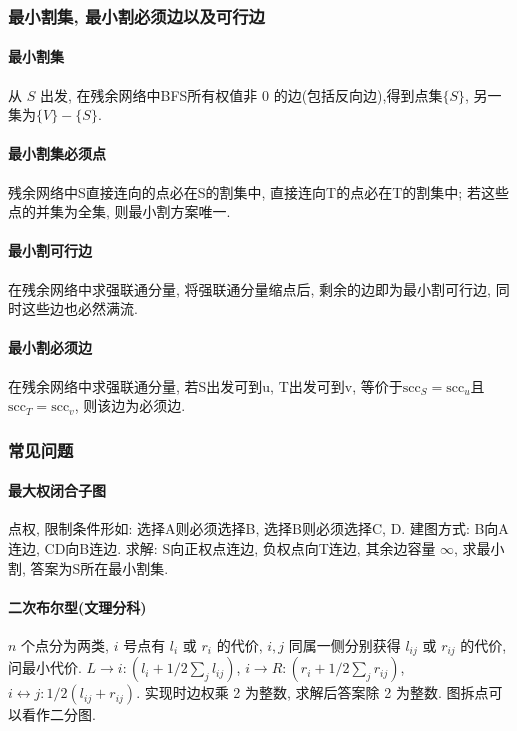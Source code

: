 \subsubsection*{最小割集, 最小割必须边以及可行边}

\paragraph{最小割集} 从 $S$ 出发, 在残余网络中BFS所有权值非 $0$ 的边(包括反向边),得到点集$\{S\}$, 另一集为$\{V\} - \{S\}$. 
\paragraph{最小割集必须点} 残余网络中S直接连向的点必在S的割集中, 直接连向T的点必在T的割集中; 若这些点的并集为全集, 则最小割方案唯一.
\paragraph{最小割可行边} 在残余网络中求强联通分量, 将强联通分量缩点后, 剩余的边即为最小割可行边, 同时这些边也必然满流.
\paragraph{最小割必须边} 在残余网络中求强联通分量, 若S出发可到u, T出发可到v, 等价于$\mathrm{scc}_S=\mathrm{scc}_u$且$\mathrm{scc}_T = \mathrm{scc}_v$, 则该边为必须边.

\subsubsection*{常见问题}

\paragraph{最大权闭合子图}
点权, 限制条件形如: 选择A则必须选择B, 选择B则必须选择C, D. 建图方式: B向A连边, CD向B连边.
求解: S向正权点连边, 负权点向T连边, 其余边容量 $\infty$, 求最小割, 答案为S所在最小割集.
\paragraph{二次布尔型(文理分科)}
$n$ 个点分为两类, $i$ 号点有 $l_{i}$ 或 $r_{i}$ 的代价, $i, j$ 同属一侧分别获得 $l_{ij}$ 或 $r_{ij}$ 的代价, 问最小代价.
$L\rightarrow i: (l_i + 1/2 \sum_{j} l_{ij})$, $i \rightarrow R: (r_i + 1/2 \sum_{j} r_{ij})$,
$i \leftrightarrow j: 1/2 (l_{ij} + r_{ij})$. 实现时边权乘 2 为整数, 求解后答案除 2 为整数. 图拆点可以看作二分图.

